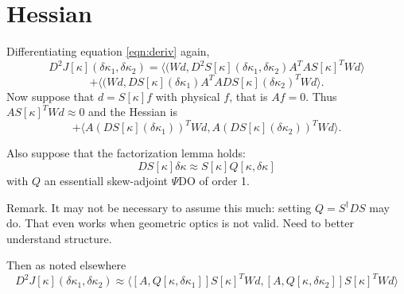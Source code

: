 \section{Hessian}
Differentiating equation \ref{eqn:deriv} again,
\[
D^2J[\kappa](\delta \kappa_1,\delta \kappa_2)
= \langle( Wd, D^2S[\kappa](\delta \kappa_1,\delta \kappa_2) A^TA
S[\kappa]^TWd\rangle
\]
\[
+ \langle( Wd, DS[\kappa](\delta \kappa_1) A^TA DS[\kappa](\delta 
\kappa_2)^TWd\rangle. 
\]
Now suppose that $d = S[\kappa]f$ with physical $f$, that is
$Af=0$. Thus $AS[\kappa]^TWd \approx 0$ and the Hessian is
\begin{equation}
\label{eqn:hess1}
+ \langle A(DS[\kappa](\delta \kappa_1))^T Wd, A (DS[\kappa](\delta 
\kappa_2))^TWd\rangle. 
\end{equation}

 Also suppose that the factorization lemma holds:
\begin{equation}
\label{eqn:fact}
DS[\kappa]\delta \kappa \approx S[\kappa]Q[\kappa,\delta \kappa]
\end{equation}
with $Q$ an essentiall skew-adjoint $\Psi$DO of order 1.

Remark. It may not be necessary to assume this much: setting 
$Q = S^{\dagger}DS$ may do. That even works when geometric optics is
not valid. Need to better understand structure.

Then as noted elsewhere
\begin{equation}
\label{eqn:hess2}
D^2J[\kappa](\delta \kappa_1,\delta \kappa_2) 
\approx \langle [A,Q[\kappa,\delta \kappa_1]]S[\kappa]^TWd,
[A,Q[\kappa,\delta \kappa_2]]S[\kappa]^TWd\rangle
\end{equation}

